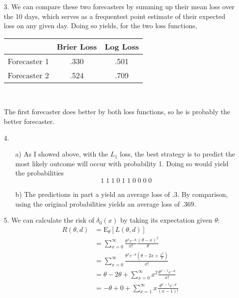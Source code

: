 \documentclass[11pt]{article}
\newcommand{\E}{\mathrm{E}}
\theoremstyle{definition}
\begin{document}
\begin{itemize}
\begin{itemize}
        \end{itemize}
    \item[3.]
        We can compare these two forecasters by summing up their mean loss over the 10 days, which serves as a frequentest point estimate of their expected loss on any given day. Doing so yields, for the two loss functions, \\
        \begin{center}
            \begin{tabular}{c | c c}
                       \;    & Brier Loss & Log Loss \\
                \hline
                Forecaster 1 & .330      & .501 \\
                Forecaster 2 & .524      & .709 \\
            \end{tabular} \\
        \end{center}
        The first forecaster does better by both loss functions, so he is probably the better forecaster.
    \item[4.]
        \begin{itemize}
            \item[a)]
                As I showed above, with the $L_1$ loss, the best strategy is to predict the most likely outcome will occur with probability 1. Doing so would yield the probabilities
                \[1 \;1 \;1 \;0 \;1 \;1 \;0 \;0 \;0 \;0\]
            \item[b)]
                The predictions in part a yield an average loss of $.3$. By comparison, using the original probabilities yields an average loss of $.369$.
        \end{itemize}
    \item[5.]
        We can calculate the risk of $\delta_0(x)$ by taking its expectation given $\theta$:
        \begin{align*}
            R(\theta,d) &= \E_\theta[L(\theta,d)] \\
                        &= \sum_{x=0}^\infty \frac{\theta^xe^{-\theta}}{x!}\frac{(\theta-x)^2}{\theta}  \\
                        &= \sum_{x=0}^\infty \frac{\theta^xe^{-\theta}(\theta-2x +\frac{x^2}{\theta})}{x!}\\
                        &= \theta -2\theta + \sum_{x=0}^\infty x^2\frac{\theta^{x-1}e^{-\theta}}{x!} \\
                        &= -\theta + 0 + \sum_{x=1}^\infty x\frac{\theta^{x-1}e^{-\theta}}{(x-1)!} \\

\end{align*}
\end{itemize}
\end{document}

